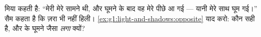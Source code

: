 \begin{exercise}[$\star\star$]\label{exo:g1:light-and-shadows:9}
मिया कहती है: ``मेरी  मेरे सामने थी, और घूमने के बाद वह मेरे पीछे
आ गई --- यानी  मेरे साथ घूम गई।'' सैम कहता है कि  ज़रा भी नहीं
हिली। \cref{ex:g1:light-and-shadows:opposite} याद करो: कौन सही है,
और  के घूमने जैसा \emph{लगा} क्यों?
\end{exercise}
